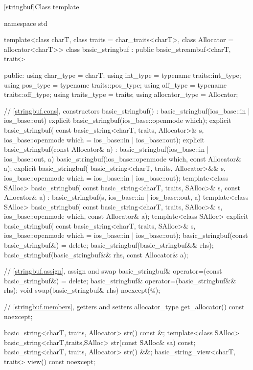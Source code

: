 [stringbuf]{Class template }
%
\begin{codeblock}
namespace std {
  template<class charT, class traits = char_traits<charT>,
           class Allocator = allocator<charT>>
  class basic_stringbuf : public basic_streambuf<charT, traits> {
  public:
    using char_type      = charT;
    using int_type       = typename traits::int_type;
    using pos_type       = typename traits::pos_type;
    using off_type       = typename traits::off_type;
    using traits_type    = traits;
    using allocator_type = Allocator;

    // \ref{stringbuf.cons}, constructors
    basic_stringbuf() : basic_stringbuf(ios_base::in | ios_base::out) {}
    explicit basic_stringbuf(ios_base::openmode which);
    explicit basic_stringbuf(
      const basic_string<charT, traits, Allocator>& s,
      ios_base::openmode which = ios_base::in | ios_base::out);
    explicit basic_stringbuf(const Allocator& a)
      : basic_stringbuf(ios_base::in | ios_base::out, a) {}
    basic_stringbuf(ios_base::openmode which, const Allocator& a);
    explicit basic_stringbuf(
      basic_string<charT, traits, Allocator>&& s,
      ios_base::openmode which = ios_base::in | ios_base::out);
    template<class SAlloc>
      basic_stringbuf(
        const basic_string<charT, traits, SAlloc>& s, const Allocator& a)
        : basic_stringbuf(s, ios_base::in | ios_base::out, a) {}
    template<class SAlloc>
      basic_stringbuf(
        const basic_string<charT, traits, SAlloc>& s,
        ios_base::openmode which, const Allocator& a);
    template<class SAlloc>
      explicit basic_stringbuf(
        const basic_string<charT, traits, SAlloc>& s,
        ios_base::openmode which = ios_base::in | ios_base::out);
    basic_stringbuf(const basic_stringbuf&) = delete;
    basic_stringbuf(basic_stringbuf&& rhs);
    basic_stringbuf(basic_stringbuf&& rhs, const Allocator& a);

    // \ref{stringbuf.assign}, assign and swap
    basic_stringbuf& operator=(const basic_stringbuf&) = delete;
    basic_stringbuf& operator=(basic_stringbuf&& rhs);
    void swap(basic_stringbuf& rhs) noexcept(@\seebelow@);

    // \ref{stringbuf.members}, getters and setters
    allocator_type get_allocator() const noexcept;

    basic_string<charT, traits, Allocator> str() const &;
    template<class SAlloc>
      basic_string<charT,traits,SAlloc> str(const SAlloc& sa) const;
    basic_string<charT, traits, Allocator> str() &&;
    basic_string_view<charT, traits> view() const noexcept;

}}
\end{codeblock}
